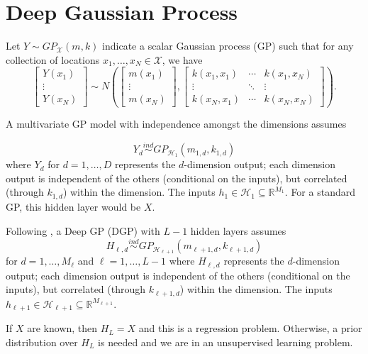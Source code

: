 \documentclass{article}
\newcommand{\ind}{\stackrel{ind}{\sim}}
\begin{document}
\section{Deep Gaussian Process}

Let $Y\sim GP_{\mathcal{X}}(m,k)$ indicate a scalar Gaussian process (GP) such that 
for any collection of locations $x_1,\ldots,x_N \in \mathcal{X}$, 
we have
\[
\left[ \begin{array}{c} Y(x_1) \\ \vdots \\ Y(x_N) \end{array}  \right] \sim 
N\left(\left[\begin{array}{c}
m(x_1) \\ \vdots \\ m(x_N)
\end{array} \right], 
\left[ \begin{array}{ccc}
k(x_1,x_1) & \cdots & k(x_1,x_N) \\
\vdots & \ddots & \vdots \\
k(x_N,x_1) & \cdots & k(x_N,x_N) 
\end{array} \right] \right).
\]


A multivariate GP model with independence amongst the dimensions assumes 

\[
Y_d \ind GP_{\mathcal{H}_{1}}(m_{1,d},k_{1,d}) 
\]
where $Y_d$ for $d=1,\ldots,D$ represents the $d$-dimension output;
each dimension output is independent of the others (conditional on the inputs), 
but correlated (through $k_{1,d}$) within the dimension.
The inputs $h_{1} \in \mathcal{H}_{1}\subseteq \mathbb{R}^{M_{1}}$.
For a standard GP, this hidden layer would be $X$. 

Following \cite{damianou2013deep}, 
a Deep GP (DGP) with $L-1$ hidden layers assumes 
\[
H_{\ell,d} \ind GP_{\mathcal{H}_{\ell+1}}(m_{\ell+1,d},k_{\ell+1,d}) 
\]
for $d=1,\ldots,M_{\ell}$ and $\ell = 1,\ldots,L-1$
where $H_{\ell,d}$ represents the $d$-dimension output; 
each dimension output is independent of the others (conditional on the inputs), 
but correlated (through $k_{\ell+1,d}$) within the dimension.
The inputs $h_{\ell+1} \in \mathcal{H}_{\ell+1}\subseteq \mathbb{R}^{M_{\ell+1}}$.

If $X$ are known, then $H_L = X$ and this is a regression problem.
Otherwise, a prior distribution over $H_L$ is needed and we are in an 
unsupervised learning problem.
\end{document}

